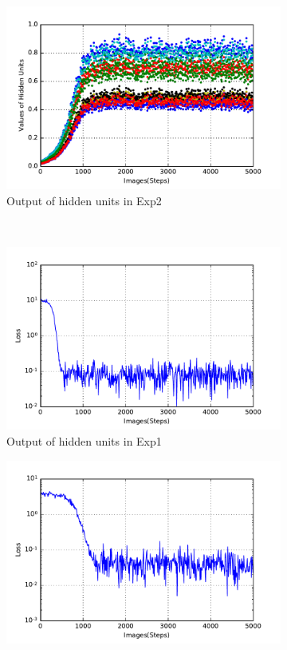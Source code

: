 \begin{figure}
\begin{subfigure}[t]{0.4\textwidth}
		\includegraphics[width=\textwidth]{pics_sdlm/21_exp_AE_noise/exp2_hid_s.pdf}
		\caption{Output of hidden units in Exp2}
	\end{subfigure}\\
	\begin{subfigure}[t]{0.4\textwidth}
		\includegraphics[width=\textwidth]{pics_sdlm/21_exp_AE_noise/exp1_loss_s.pdf}
		\caption{Output of hidden units in Exp1}
	\end{subfigure}
	\begin{subfigure}[t]{0.4\textwidth}
		\includegraphics[width=\textwidth]{pics_sdlm/21_exp_AE_noise/exp2_loss_s.pdf}

\end{subfigure}
\end{figure}

